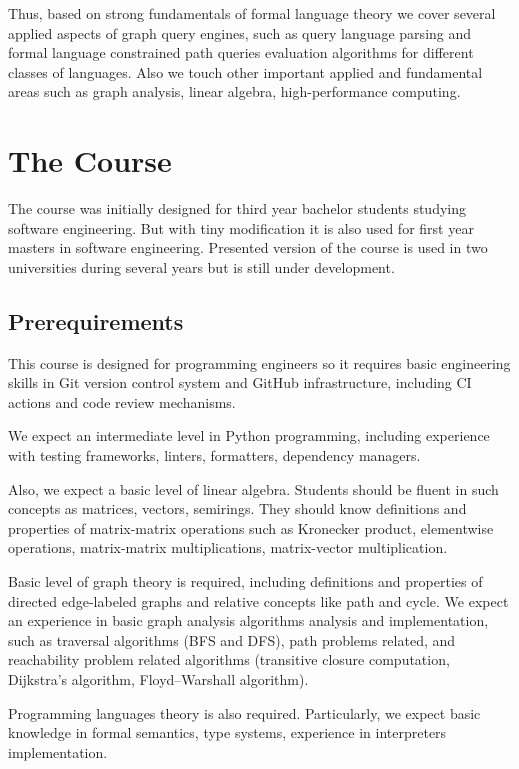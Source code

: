 \documentclass[sigconf]{acmart}
\begin{document}
Thus, based on strong fundamentals of formal language theory we cover several applied aspects of graph query engines, such as query language parsing and formal language constrained path queries evaluation algorithms for different classes of languages.
Also we touch other important applied and fundamental areas such as graph analysis, linear algebra, high-performance computing.

\section{The Course}

The course was initially designed for third year bachelor students studying software engineering.
But with tiny modification it is also used for first year masters in software engineering.
Presented version of the course is used in two universities during several years but is still under development.

\subsection{Prerequirements}

This course is designed for programming engineers so it requires basic engineering skills in Git version control system and GitHub infrastructure, including CI actions and code review mechanisms.

We expect an intermediate level in Python programming, including experience with testing frameworks, linters, formatters, dependency managers. 

Also, we expect a basic level of linear algebra.
Students should be fluent in such concepts as matrices, vectors, semirings.
They should know definitions and properties of matrix-matrix operations such as Kronecker product, elementwise operations, matrix-matrix multiplications, matrix-vector multiplication. 

Basic level of graph theory is required, including definitions and properties of directed edge-labeled graphs and relative concepts like path and cycle.
We expect an experience in basic graph analysis algorithms analysis and implementation, such as traversal algorithms (BFS and DFS), path problems related, and reachability problem related algorithms (transitive closure computation, Dijkstra's algorithm, Floyd–Warshall algorithm).

Programming languages theory is also required. 
Particularly, we expect basic knowledge in formal semantics, type systems, experience in interpreters implementation.
\end{document}
